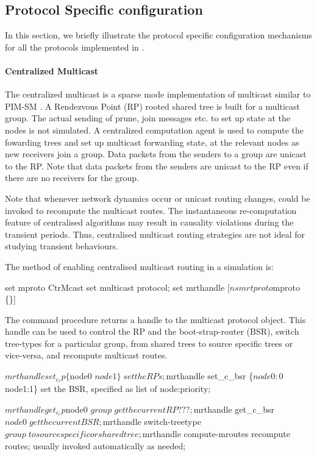 \subsection{Protocol Specific configuration}

In this section, we briefly illustrate the
protocol specific configuration mechanisms
for all the protocols implemented in \ns.

\paragraph{Centralized Multicast}
The centralized multicast is a sparse mode implementation of multicast
similar to PIM-SM \cite{Deer94a:Architecture}.
A Rendezvous Point (RP) rooted shared tree is built
for a multicast group.  The actual sending of prune, join messages
etc. to set up state at the nodes is not simulated.  A centralized
computation agent is used to compute the fowarding trees and set up
multicast forwarding state,  at the relevant nodes as new
receivers join a group.  Data packets from the senders to a group are
unicast to the RP.  Note that data packets from the senders are
unicast to the RP even if there are no receivers for the group.

Note that whenever network dynamics occur or unicast routing changes,
 could be invoked to recompute the multicast routes.
The instantaneous re-computation feature of centralised algorithms
may result in causality violations during the transient
periods.  Thus, centralised multicast routing strategies are not
ideal for studying transient behaviours.

The method of enabling centralised multicast routing in a simulation is:
\begin{program}
        set mproto CtrMcast    \; set multicast protocol;
        set mrthandle [$ns mrtproto $mproto \{\}]
\end{program}
The command procedure 
returns a handle to the multicast protocol object.
This handle can be used to control the RP and the boot-strap-router (BSR),
switch tree-types for a particular group,
from shared trees to source specific trees or vice-versa, and
recompute multicast routes.
\begin{program}
        $mrthandle set_c_rp \{$node0 $node1\}      \; set the RPs;
        $mrthandle set_c_bsr \{$node0:0 $node1:1\} \; set the BSR, specified as list of node:priority;

        $mrthandle get_c_rp $node0 $group          \; get the current RP ???;
        $mrthandle get_c_bsr $node0                \; get the current BSR;

        $mrthandle switch-treetype $group         \; to source specific or shared tree;

        $mrthandle compute-mroutes       \; recompute routes; usually invoked automatically as needed;
\end{program}


